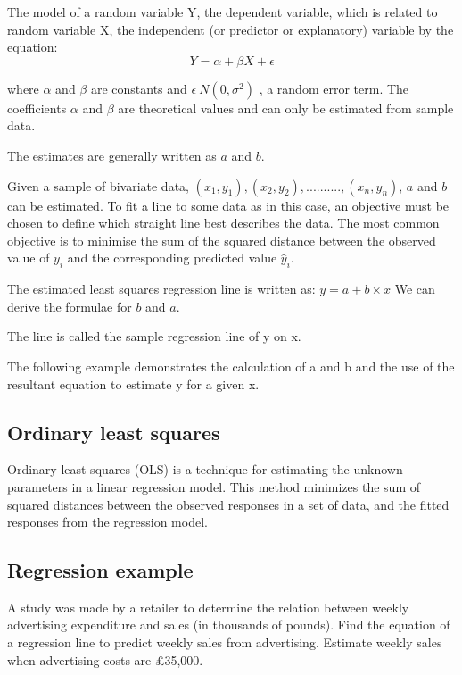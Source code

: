 \documentclass[12pt, a4paper]{report}
\theoremstyle{plain}
\theoremstyle{definition}
\theoremstyle{remark}
\begin{document}
The model of a random variable Y, the dependent variable, which is related to random
variable X, the independent (or predictor or explanatory) variable by the equation:
\begin{equation}
Y = \alpha + \beta X + \epsilon
\end{equation}

where $\alpha$ and $\beta$ are constants and $\epsilon ~ N ( 0,\sigma^2)$ , a random error term. The
coefficients $\alpha$ and $\beta$  are theoretical values and can only be estimated from sample data.

The estimates are generally written as $a$ and $b$.

Given a sample of bivariate data, $(x_1,y_1),(x_2,y_2) ,.........., (x_n,y_n)$, $a$ and $b$ can be
estimated. To fit a line to some data as in this case, an objective must be chosen to
define which straight line best describes the data. The most common objective is to
minimise the sum of the squared distance between the observed value of $y_i$
and the corresponding predicted value $\hat{y}_i$.

The estimated least squares regression line is written as:
$y = a + b\times x$
We can derive the formulae for $b$ and $a$.



The line is called the sample regression line of y on x.

The following example demonstrates the calculation of a and b and the use of the resultant
equation to estimate y for a given x.

\subsection{Ordinary least squares}
Ordinary least squares (OLS) is a technique for estimating the unknown parameters in a linear regression model. This method minimizes the sum of squared distances between the observed responses in a set of data, and the fitted responses from the regression model.

\subsection{Regression example}
A study was made by a retailer to determine the relation between weekly advertising
expenditure and sales (in thousands of pounds). Find the equation of a regression line
to predict weekly sales from advertising. Estimate weekly sales when advertising
costs are £35,000.
\end{document}
